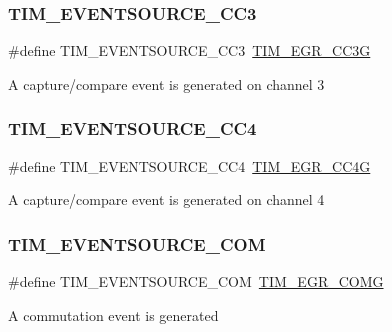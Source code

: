 \subsubsection{\texorpdfstring{TIM\_EVENTSOURCE\_CC3}{TIM\_EVENTSOURCE\_CC3}}
{\footnotesize\ttfamily \#define T\+I\+M\+\_\+\+E\+V\+E\+N\+T\+S\+O\+U\+R\+C\+E\+\_\+\+C\+C3~\mbox{\hyperlink{group___peripheral___registers___bits___definition_ga064d2030abccc099ded418fd81d6aa07}{T\+I\+M\+\_\+\+E\+G\+R\+\_\+\+C\+C3G}}}

A capture/compare event is generated on channel 3 \mbox{\label{group___t_i_m___event___source_ga157e43c99e6a1c0097b184cc842b5dfb}} 
\subsubsection{\texorpdfstring{TIM\_EVENTSOURCE\_CC4}{TIM\_EVENTSOURCE\_CC4}}
{\footnotesize\ttfamily \#define T\+I\+M\+\_\+\+E\+V\+E\+N\+T\+S\+O\+U\+R\+C\+E\+\_\+\+C\+C4~\mbox{\hyperlink{group___peripheral___registers___bits___definition_ga1c4e5555dd3be8ab1e631d1053f4a305}{T\+I\+M\+\_\+\+E\+G\+R\+\_\+\+C\+C4G}}}

A capture/compare event is generated on channel 4 \mbox{\label{group___t_i_m___event___source_ga5724ce4aaf842a2166edaaff1531c1d1}} 
\subsubsection{\texorpdfstring{TIM\_EVENTSOURCE\_COM}{TIM\_EVENTSOURCE\_COM}}
{\footnotesize\ttfamily \#define T\+I\+M\+\_\+\+E\+V\+E\+N\+T\+S\+O\+U\+R\+C\+E\+\_\+\+C\+OM~\mbox{\hyperlink{group___peripheral___registers___bits___definition_gadb06f8bb364307695c7d6a028391de7b}{T\+I\+M\+\_\+\+E\+G\+R\+\_\+\+C\+O\+MG}}}

A commutation event is generated \mbox{\label{group___t_i_m___event___source_ga85573ed76442490db67e4b759fe6d901}} 
